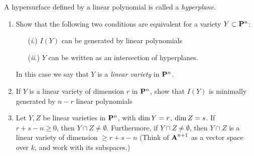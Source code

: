 \documentclass[10pt]{amsart}
\begin{document}
\begin{exercise}[2.11]
    A hypersurface defined by a linear polynomial is called a \emph{hyperplane}. 
        \begin{enumerate}
            \item Show that the following two conditions are equivalent for a variety $Y \subset \bbP^n$: 
                \begin{itemize}
                \item[(\emph{i}.)] $I(Y)$ can be generated by linear polynomials
                \item[(\emph{ii}.)] $Y$ can be written as an intersection of hyperplanes. 
                \end{itemize}
                In this case we say that $Y$ is a \emph{linear variety} in $\bbP^n$.
            \item If $Y$ is a linear variety of dimension $r$ in $\bbP^n$, show that $I(Y)$ is minimally generated by $n-r$ linear polynomials 
            \item Let $Y,Z$ be linear varieties in $\bbP^n$, with $\Dim Y = r$, $\Dim Z = s$. If $r+s-n \geq 0$, then $Y \cap Z \neq \emptyset$. 
            Furthermore, if $Y \cap Z \neq \emptyset$, then $Y \cap Z$ is a linear variety 
            of dimension $\geq r+s-n$ (Think of $\aa^{n+1}$ as a vector 
            space over $k$, and work with its subspaces.)
        \end{enumerate}
\end{exercise}

\begin{solution}
    
\end{solution}
\end{document}
